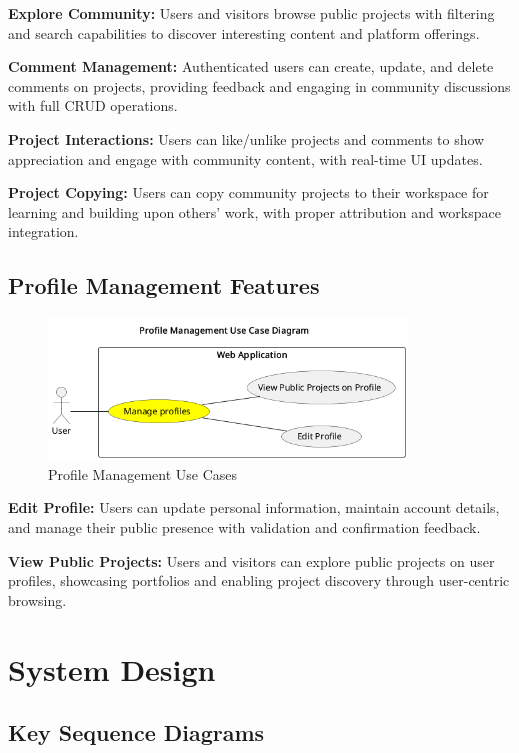 \textbf{Explore Community:} Users and visitors browse public projects with filtering and search capabilities to discover interesting content and platform offerings.

\textbf{Comment Management:} Authenticated users can create, update, and delete comments on projects, providing feedback and engaging in community discussions with full CRUD operations.

\textbf{Project Interactions:} Users can like/unlike projects and comments to show appreciation and engage with community content, with real-time UI updates.

\textbf{Project Copying:} Users can copy community projects to their workspace for learning and building upon others' work, with proper attribution and workspace integration.

\subsection{Profile Management Features}

\begin{figure}[H]
\centering
\includegraphics[width=0.85\textwidth]{conception/SprintV/use_case_diagrams/refined_use_case_feature_profiles .png}
\caption{Profile Management Use Cases}
\label{fig:profile_management_use_case}
\end{figure}

\textbf{Edit Profile:} Users can update personal information, maintain account details, and manage their public presence with validation and confirmation feedback.

\textbf{View Public Projects:} Users and visitors can explore public projects on user profiles, showcasing portfolios and enabling project discovery through user-centric browsing.

\section{System Design}

\subsection{Key Sequence Diagrams}

